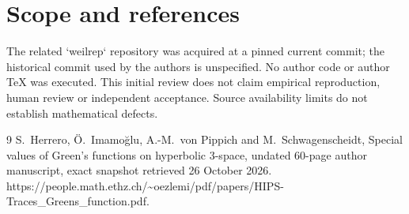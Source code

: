 \documentclass[10pt]{article}
\begin{document}
\section*{Scope and references}
The related `weilrep` repository was acquired at a pinned current commit; the historical commit used by the authors is unspecified. No author code or author TeX was executed. This initial review does not claim empirical reproduction, human review or independent acceptance. Source availability limits do not establish mathematical defects.\par
9 S. Herrero, Ö. Imamoğlu, A.-M. von Pippich and M. Schwagenscheidt, Special values of Green’s functions on hyperbolic 3-space, undated 60-page author manuscript, exact snapshot retrieved 26 October 2026. https://people.math.ethz.ch/\textasciitilde{}oezlemi/pdf/papers/HIPS-Traces\_Greens\_function.pdf.\par
\end{document}
